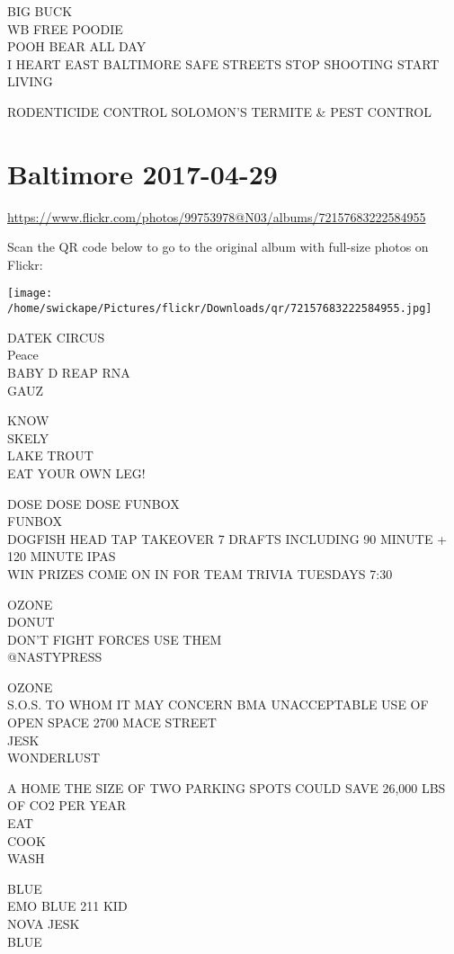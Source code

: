 \documentclass[10pt,letterpaper]{article}
\begin{document}
BIG BUCK\\
WB FREE POODIE\\
POOH BEAR ALL DAY\\
I HEART EAST BALTIMORE SAFE STREETS STOP SHOOTING START LIVING

RODENTICIDE CONTROL SOLOMON'S TERMITE \& PEST CONTROL


\section*{Baltimore 2017-04-29}

\url{https://www.flickr.com/photos/99753978@N03/albums/72157683222584955}

Scan the QR code below to go to the original album with full-size photos on Flickr:

\texttt{[image: /home/swickape/Pictures/flickr/Downloads/qr/72157683222584955.jpg]}


DATEK CIRCUS\\
Peace\\
BABY D REAP RNA\\
GAUZ

KNOW\\
SKELY\\
LAKE TROUT\\
EAT YOUR OWN LEG!

DOSE DOSE DOSE FUNBOX\\
FUNBOX\\
DOGFISH HEAD TAP TAKEOVER 7 DRAFTS INCLUDING 90 MINUTE + 120 MINUTE IPAS\\
WIN PRIZES COME ON IN FOR TEAM TRIVIA TUESDAYS 7:30

OZONE\\
DONUT\\
DON'T FIGHT FORCES USE THEM\\
@NASTYPRESS

OZONE\\
S.O.S. TO WHOM IT MAY CONCERN BMA UNACCEPTABLE USE OF OPEN SPACE 2700 MACE STREET\\
JESK\\
WONDERLUST

A HOME THE SIZE OF TWO PARKING SPOTS COULD SAVE 26,000 LBS OF CO2 PER YEAR\\
EAT\\
COOK\\
WASH

BLUE\\
EMO BLUE 211 KID\\
NOVA JESK\\
BLUE
\end{document}
